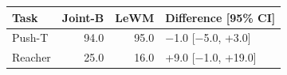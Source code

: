 \begin{tabular}{lrrl}
\toprule
Task & Joint-B & LeWM & Difference [95\% CI] \\
\midrule
Push-T & 94.0 & 95.0 & $-$1.0 [$-$5.0, +3.0] \\
Reacher & 25.0 & 16.0 & +9.0 [$-$1.0, +19.0] \\
\bottomrule
\end{tabular}
